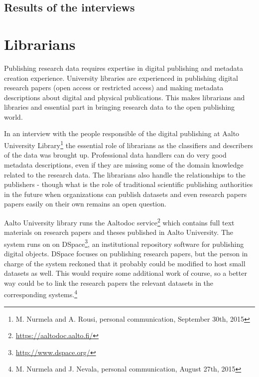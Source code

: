 \subsection{Results of the interviews}

\fi

\section{Librarians}

Publishing research data requires expertise in digital publishing and metadata creation
experience. University libraries are experienced in publishing digital research
papers (open access or restricted access) and making metadata descriptions
about digital and physical publications. This makes librarians and libraries
and essential part in bringing research data to the open publishing world.

In an interview with the people responsible of the digital publishing at Aalto
University Library\footnote{M. Nurmela and A. Rousi, personal
communication, September 30th, 2015} the essential role of
librarians as the classifiers and describers of the data was brought up. Professional data
handlers can do very good metadata descriptions, even if they are missing
some of the domain knowledge related to the research data. The librarians
also handle the relationships to the publishers - though what is the role
of traditional scientific publishing authorities in the future when organizations
can publish datasets and even research papers papers easily on their own remains
an open question.

Aalto University library runs the Aaltodoc service\footnote{\url{https://aaltodoc.aalto.fi/}}
which contains full text materials on research papers and theses published
in Aalto University. The system runs on on DSpace\footnote{\url{http://www.dspace.org/}},
an institutional repository software for publishing digital objects. DSpace
focuses on publishing research papers, but the person in charge of the system
reckoned that it probably could be modified to host small datasets as well.
This would require some additional work of course, so a better way could be to
link the research papers the relevant datasets in the corresponding systems.\footnote{M.
Nurmela and J. Nevala, personal communication, August 27th, 2015}

